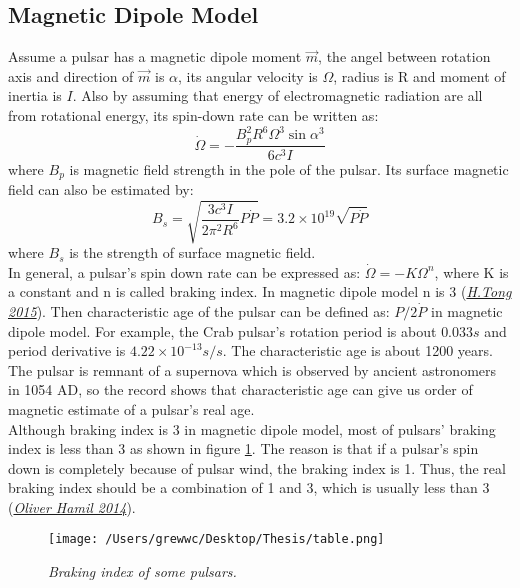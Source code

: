 \documentclass[12pt]{report}
\newcommand{\mycaption}[1]{\caption{\textit{\footnotesize #1}}}
\begin{document}
        \subsection{Magnetic Dipole Model}
            Assume a pulsar has a magnetic dipole moment $\vec{m}$, the angel between rotation axis and 
            direction of 
            $\vec{m}$ is $\alpha$, its angular velocity is $\Omega$, radius is R and moment of inertia is $I$. 
            Also by 
            assuming that energy of electromagnetic radiation are all from rotational energy, its spin-down 
            rate can be written 
            as: 
            $$
                \dot{\Omega}=-\frac{B_p^2 R^6 \Omega^3 \sin{\alpha}^3}{6c^3I}
            $$
            where $B_p$ is magnetic field strength in the pole of the pulsar. Its surface magnetic field can 
            also be estimated
            by:
            $$
                B_s=\sqrt{\frac{3c^3I}{2\pi^2R^6}P\dot{P}}=3.2\times 10^{19}\sqrt{P\dot{P}}
            $$
            where $B_s$ is the strength of surface magnetic field. \\
            \indent In general, a pulsar's spin down rate can be expressed as: $\dot{\Omega}=-K\Omega^{n}$, 
            where K is a 
            constant and n is called braking index. In magnetic dipole model n is 3 \hypersetup{urlcolor= red}
            (\href{https://arxiv.org/pdf/1506.04605.pdf}{\textit{H.Tong 2015}}). Then 
            characteristic age of the pulsar can be defined as: $P/2\dot{P}$ in magnetic dipole model. 
            For example, the Crab 
            pulsar's rotation period is about $0.033s$ and period derivative is $4.22\times 10^{-13}s/s$. 
            The characteristic 
            age is about 1200 years. The pulsar is remnant of a supernova which is observed by ancient 
            astronomers in 1054 
            AD, so the record shows that characteristic age can give us order of magnetic estimate of a 
            pulsar's real age. \\
            \indent 
            Although braking index is 3 in magnetic dipole model, most of pulsars' braking index is less than 3 as 
            shown in figure \ref{fig:braking_index}. The reason is that if a pulsar's spin down is completely because
            of pulsar wind, the braking index is 1. Thus, the real braking index should be a combination of 1 and 3,
            which is usually less than 3  \hypersetup{urlcolor= red}
            (\href{http://www.ift.uni.wroc.pl/~csqcdiv/talks/26092014/ohamil_csqcdiv.pdf}
            {\textit{Oliver Hamil 2014}}).
            \begin{figure}[!h]
              \centering
              \texttt{[image: /Users/grewwc/Desktop/Thesis/table.png]}
              \mycaption{Braking index of some pulsars.}
              \label{fig:braking_index}
            \end{figure}
    
\end{document}
